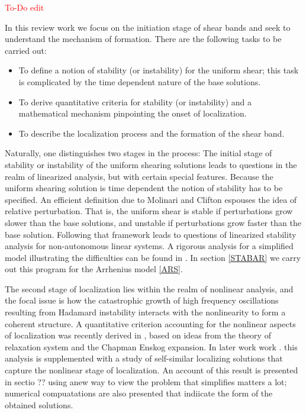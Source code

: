 \documentclass[a4paper,11pt]{article}
\newcommand{\tcr}{\textcolor{red}}
\theoremstyle{remark}
\begin{document}
\tcr{To-Do  edit}

\bigskip

In this review work we focus on the initiation stage of shear bands and seek to understand the
mechanism of formation.
There are the following tasks to be carried out:
\begin{itemize}
\item To define a notion of stability (or instability) for the uniform shear; this task is complicated
by the time dependent nature of the base solutions.
\item To derive quantitative criteria for stability (or instability) and a mathematical mechanism pinpointing the onset of localization.
\item To describe the localization process and the formation of the shear band.
\end{itemize}

Naturally, one distinguishes two stages in the process: The initial stage of stability or instability 
of the uniform shearing solutions leads to questions in the realm of linearized analysis, but with
certain special features. Because the uniform shearing solution
is time dependent the notion of stability has to be specified. An efficient definition due to
Molinari and Clifton \cite{MC87,FM87} espouses the idea of relative perturbation. That is, the uniform shear
is stable if perturbations grow slower than the base solutions, and unstable if perturbations grow
faster than the base solution. Following that framework leads to questions of linearized stability analysis 
for non-autonomous linear systems.
A rigorous analysis for a simplified model illustrating the difficulties can be found in \cite{Tzavaras92}.
In section \ref{STABAR}  we carry out this program for the Arrhenius model \eqref{ARS}.


The second stage of localization lies within the realm of nonlinear analysis, and the focal issue is how the catastrophic growth of high frequency oscillations resulting from Hadamard instability interacts with
the nonlinearity to form a coherent structure.
A quantitative criterion accounting for the nonlinear aspects of localization was recently derived in \cite{KT09},
based on ideas from the theory of relaxation system and the Chapman Enskog expansion. In later work
work \cite{LKT17}.  this analysis is supplemented with a study of self-similar localizing 
solutions that capture the nonlinear stage of localization. An account of this result is presented in sectio ??
using anew way to view the problem that simplifies matters a lot; numerical compuatations
are also presented that indiicate the form of the obtained solutions.
 
\end{document}
